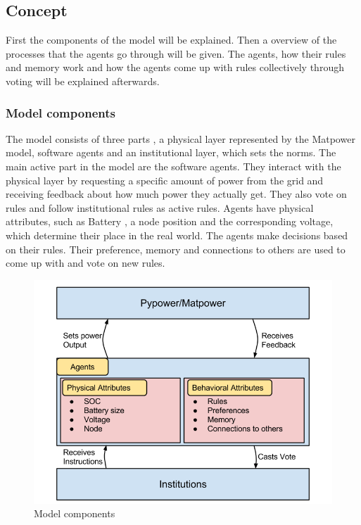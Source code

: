 \documentclass[a4paper]{article}
\begin{document}
\subsection{Concept}
First the components of the model will be explained. Then a overview of the processes that the agents go through will be 
given. The agents, how their rules and memory work and how the agents come up with rules collectively through voting 
will be explained afterwards.
\subsubsection{Model components}
The model consists of three parts , a physical layer represented by the Matpower model, software agents and an institutional 
layer, which sets the norms. 
The main active part in the model are the software agents. They interact with the physical layer by requesting a 
specific amount of power from the grid and receiving feedback about how much power they actually get. They also vote on rules 
and follow institutional rules as active rules. 
Agents have physical attributes, such as Battery , a node position and the corresponding voltage,  which determine their 
place in the real world. The agents make decisions based on their rules. Their preference, memory and connections to others 
are used to come up with and vote on new rules.
\begin{figure}[!ht]
\includegraphics[width =\textwidth]{concept_components.png}
\caption{Model components}
\label{mcomponents}
\end{figure}
\end{document}

